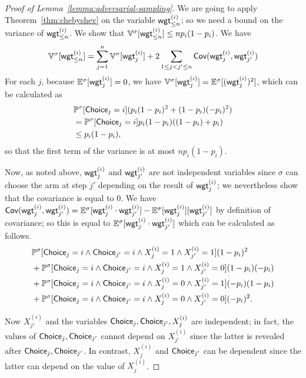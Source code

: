 \documentclass[a4paper,USenglish,cleveref, autoref, thm-restate]{lipics-v2021}
\newcommand*{\pr}{\mathbb{P}}
\newcommand*{\expect}{\mathbb{E}}
\newcommand*{\variance}{\mathbb{V}}
\newcommand*{\cov}{\textrm{\sf Cov}}
\def\Choice{\textrm{\sf Choice}}
\def\wgt{\textrm{\sf wgt}}
\begin{document}
\begin{proof}[Proof of Lemma~\ref{lemma:adversarial-sampling}]
  We are going to apply Theorem~\ref{thm:chebyshev} on the variable $\wgt_{\leq n}^{(i)}$; so we need a bound on the variance of $\wgt_{\leq n}^{(i)}$.
  We show that $\variance^\sigma[\wgt_{\leq n}^{(i)}]\leq np_i(1-p_i)$.
  We have 
  \[
    \variance^\sigma[\wgt_{\leq n}^{(i)}] = \sum_{j=1}^n \variance^\sigma[\wgt_j^{(i)}] + 2\sum_{1\leq j<j'\leq n} \cov(\wgt_j^{(i)},\wgt_{j'}^{(i)})
  \]
  For each $j$, because $\expect^\sigma[\wgt_j^{(i)}] = 0$, we have $\variance^\sigma[\wgt_j^{(i)}]=\expect^\sigma[(\wgt_j^{(i)})^2]$,
  which can be calculated as 
  \begin{align*}
    &\pr^\sigma[\Choice_j=i](p_i (1-p_i)^2 + (1-p_i)(-p_i)^2)\\
    &=\pr^\sigma[\Choice_j=i]p_i(1-p_i)((1-p_i) + p_i)\\
    &\leq p_i(1-p_i),
  \end{align*}
  so that the first term of the variance is at most $np_i(1-p_i)$.

  Now, as noted above, $\wgt_j^{(i)}$ and $\wgt_{j'}^{(i)}$ are not independent variables since $\sigma$ can choose the arm at step $j'$ depending on the result of 
  $\wgt_j^{(i)}$; we nevertheless show that the covariance is equal to $0$.
  We have $\cov(\wgt_j^{(i)},\wgt_{j'}^{(i)}) = \expect^\sigma[\wgt_j^{(i)} \cdot \wgt_{j'}^{(i)}] - \expect^\sigma[\wgt_j^{(i)}][\wgt_{j'}^{(i)}]$ by definition of covariance;
  so this is equal to $\expect^\sigma[\wgt_j^{(i)} \cdot \wgt_{j'}^{(i)}]$ which can be calculated as follows.
  \begin{align*}
    & \pr^\sigma[ \Choice_j=i \land \Choice_{j'}=i \land X_j^{(i)}=1 \land X_{j'}^{(i)}=1](1-p_i)^2\\
    & +\pr^\sigma[ \Choice_j=i \land \Choice_{j'}=i \land X_j^{(i)}=1 \land X_{j'}^{(i)}=0](1-p_i)(-p_i)\\
    & +\pr^\sigma[ \Choice_j=i \land \Choice_{j'}=i \land X_j^{(i)}=0 \land X_{j'}^{(i)}=1](-p_i)(1-p_i)\\    
    & +\pr^\sigma[ \Choice_j=i \land \Choice_{j'}=i \land X_j^{(i)}=0 \land X_{j'}^{(i)}=0](-p_i)^2.
  \end{align*}

  Now $X_{j'}^{(i)}$ and the variables $\Choice_j, \Choice_{j'}, X_{j}^{(i)}$ are independent; in fact, the values of $\Choice_j, \Choice_{j'}$  cannot depend on
  $X_{j'}^{(i)}$ since the latter is revealed after $\Choice_j, \Choice_{j'}$.
  In contrast,
  $X_{j}^{(i)}$ and $\Choice_{j'}$ can be dependent since the latter can depend on the value of $X_{j}^{(i)}$.
  

\end{proof}
\end{document}
